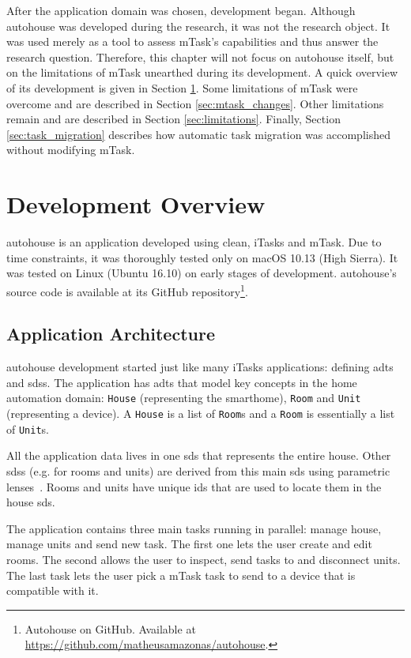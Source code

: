 After the application domain was chosen, development began. Although \gls{autohouse} was developed during the research, it was not the research object. It was used merely as a tool to assess \gls{mTask}'s capabilities and thus answer the research question. Therefore, this chapter will not focus on \gls{autohouse} itself, but on the limitations of \gls{mTask} unearthed during its development. A quick overview of its development is given in Section \ref{sec:dev_overview}. Some limitations of \gls{mTask} were overcome and are described in Section \ref{sec:mtask_changes}. Other limitations remain and are described in Section \ref{sec:limitations}. Finally, Section \ref{sec:task_migration} describes how automatic task migration was accomplished without modifying \gls{mTask}.

\section{Development Overview}\label{sec:dev_overview}
\gls{autohouse} is an application developed using \gls{clean}, \gls{iTasks} and \gls{mTask}. Due to time constraints, it was thoroughly tested only on macOS 10.13 (High Sierra). It was tested on Linux (Ubuntu 16.10) on early stages of development. \gls{autohouse}'s source code is available at its GitHub repository\footnote{Autohouse on GitHub. Available at \url{https://github.com/matheusamazonas/autohouse}.}.

\subsection{Application Architecture}
\gls{autohouse} development started just like many \gls{iTasks} applications: defining \acsp{adt} and \acsp{sds}. The application has \acsp{adt} that model key concepts in the home automation domain: \texttt{House} (representing the smarthome), \texttt{Room} and \texttt{Unit} (representing a device). A \texttt{House} is a list of \texttt{Room}s and a \texttt{Room} is essentially a list of \texttt{Unit}s. 

All the application data lives in one \acs{sds} that represents the entire house. Other \acsp{sds} (e.g. for rooms and units) are derived from this main \acs{sds} using parametric lenses~\cite{parametric}. Rooms and units have unique ids that are used to locate them in the house \acs{sds}. 

The application contains three main tasks running in parallel: manage house, manage units and send new task. The first one lets the user create and edit rooms. The second allows the user to inspect, send tasks to and disconnect units. The last task lets the user pick a \gls{mTask} task to send to a device that is compatible with it.

